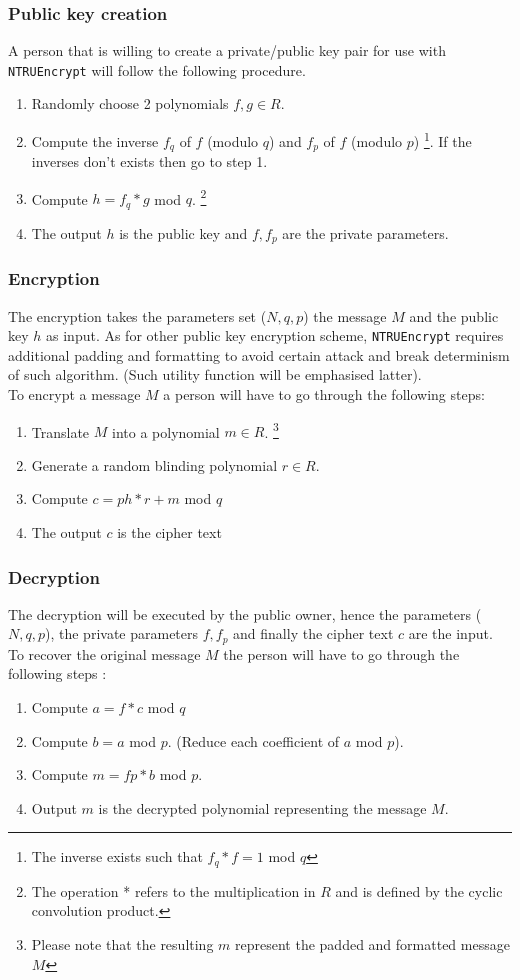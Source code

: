 \subsubsection{Public key creation}
A person that is willing to create a private/public key pair for use with \texttt{NTRUEncrypt} will follow the following procedure.
\begin{enumerate}
	\item Randomly choose 2 polynomials $f,g \in R$. 
	\item Compute the inverse $f_q$ of $f$ (modulo $q$) and $f_p$ of $f$ (modulo $p$) \footnote{The inverse exists such that $f_q * f = 1 $ mod $q$}. If the inverses don't exists then go to step 1.
	\item Compute $h = f_q *g$ mod $q$. \footnote{The operation * refers to the multiplication in $R$ and is defined by the cyclic convolution product.}
	\item The output $h$ is the public key and $f,f_p$ are the private parameters.
\end{enumerate} 
\subsubsection{Encryption}
The encryption takes the parameters set ($N,q,p$) the message $M$ and the public key $h$ as input. As for other public key encryption scheme, \texttt{NTRUEncrypt} requires additional padding and formatting to avoid certain attack and break determinism of such algorithm. (Such utility function will be emphasised latter).\\
To encrypt a message $M$ a person will have to go through the following steps:
\begin{enumerate}
	\item Translate $M$ into a polynomial $m \in R$. \footnote{Please note that the resulting $m$ represent the padded and formatted message $M$}
	\item Generate a random blinding polynomial $r \in R$.
	\item Compute $c=ph*r+m$ mod $q$
	\item The output $c$ is the cipher text
\end{enumerate}

\subsubsection{Decryption}
The decryption will be executed by the public owner, hence the parameters ($N,q,p$), the private parameters $f,f_p$ and finally the cipher text $c$ are the input.\\
To recover the original message $M$ the person will have to go through the following steps :
\begin{enumerate}
	\item Compute $a=f*c$ mod $q$
	\item Compute $b=a$ mod $p$. (Reduce each coefficient of $a$ mod $p$).
	\item Compute $m=fp*b$ mod $p$.
	\item Output $m$ is the decrypted polynomial representing the message $M$.
\end{enumerate}

